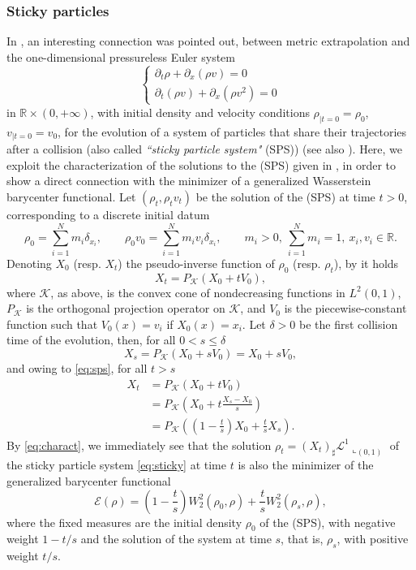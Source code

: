 \documentclass[12pt,a4paper]{article}
\newcommand{\R}{\mathbb{R}}
\newcommand{\K}{\mathcal{K}}
\theoremstyle{plain}
\theoremstyle{definition}
\begin{document}
\subsubsection*{Sticky particles} In \cite[Remarks 4.6 and 4.13]{gallouet2024}, an interesting connection was pointed out, between metric extrapolation and the one-dimensional pressureless Euler system
\begin{equation}
\label{eq:sticky}
\left\{
    \begin{array}{r}
        \partial_t \rho + \partial_x(\rho v) =0 \\
        \partial_t (\rho v) + \partial_x(\rho v^2) =0 
    \end{array}
  \right.  
\end{equation}
in $\R \times (0,+\infty)$, with initial density and velocity conditions $\rho_{|t=0}=\rho_0$, $v_{|t=0}=v_0$, for the evolution of a system of particles that share their trajectories after a collision (also called \emph{``sticky particle system"} (SPS)) (see also \cite{brenier}). Here, we exploit the characterization of the solutions to the (SPS) given in \cite{natile-savare}, in order to show a direct connection with the minimizer of a generalized Wasserstein barycenter functional. Let $(\rho_t,\rho_tv_t)$ be the solution of the (SPS) at time $t>0$, corresponding to a discrete initial datum
\[
	\rho_0 = \sum_{i=1}^N m_i \delta_{x_i},\qquad \rho_0v_0 = \sum_{i=1}^N m_i v_i \delta_{x_i},\qquad m_i>0,\ \sum_{i=1}^N m_i=1,\ x_i,v_i\in \R.
\]
Denoting $X_0$ (resp. $X_t$) the pseudo-inverse function of $\rho_0$ (resp. $\rho_t$), by \cite[Theorem 2.6 - II]{natile-savare} it holds
\begin{equation}
\label{eq:sps}
    X_t = P_\K(X_0+tV_0),
\end{equation}
where $\K$, as above, is the convex cone of nondecreasing functions in $L^2(0,1)$,   $P_\K$ is the orthogonal projection operator on $\K$, and $V_0$ is the piecewise-constant function such that $V_0(x)=v_i$ if $X_0(x)=x_i$. Let $\delta>0$ be the first collision time of the evolution, then, for all $0<s\leq \delta$
\begin{equation*}
    X_s = P_\K(X_0+sV_0) = X_0 +sV_0,
\end{equation*}
and owing to \eqref{eq:sps}, for all $t>s$
\begin{align*}
    X_t &= P_\K (X_0 +tV_0) \\
        &= P_\K \left(X_0 +t\frac{X_s-X_0}{s}\right) \\
        &= P_\K \left(\left(1-\frac{t}{s}\right)X_0 +\frac{t}{s}X_s\right).
\end{align*}
By \eqref{eq:charact}, we immediately see that the solution $\rho_t = (X_t)_\sharp \mathcal L^1\llcorner_{(0,1)}$ of the sticky particle system \eqref{eq:sticky} at time $t$ is also the minimizer of the generalized barycenter functional
\[
    \mathscr{E}(\rho)= \left(1-\frac{t}{s}\right)W_2^2(\rho_0,\rho) +\frac{t}{s}W_2^2(\rho_s,\rho),
\]
where the fixed measures are the initial density $\rho_0$ of the (SPS), with negative weight $1-t/s$ and the solution of the system at time $s$, that is, $\rho_s$, with positive weight $t/s$.
\end{document}
